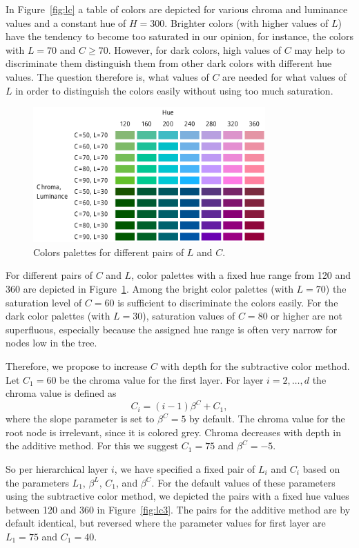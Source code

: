 \documentclass[review,journal]{vgtc}         %
\begin{document}
In Figure~\ref{fig:lc} a table of colors are depicted for various chroma and luminance values and a constant hue of $H=300$. Brighter colors (with higher values of $L$) have the tendency to become too saturated in our opinion, for instance, the colors with $L=70$ and $C\geq70$. However, for dark colors, high values of $C$ may help to discriminate them distinguish them from other dark colors with different hue values. The question therefore is, what values of $C$ are needed for what values of $L$ in order to distinguish the colors easily without using too much saturation.


\begin{figure}[!b]
  \centering
  \includegraphics[width=3.5in]{LC2.pdf}
  \caption{Colors palettes for different pairs of $L$ and $C$.}\label{fig:lc2}
\end{figure}

For different pairs of $C$ and $L$, color palettes with a fixed hue range from 120 and 360 are depicted in Figure~\ref{fig:lc2}. Among the bright color palettes (with $L=70$) the saturation level of $C=60$ is sufficient to discriminate the colors easily. For the dark color palettes (with $L=30$), saturation values of $C=80$ or higher are not superfluous, especially because the assigned hue range is often very narrow for nodes low in the tree.

Therefore, we propose to increase $C$ with depth for the subtractive color method. Let $C_1=60$ be the chroma value for the first layer. For layer $i=2,\ldots, d$ the chroma value is defined as
\begin{equation}
C_i=(i-1)\beta^C + C_1,
\end{equation}
where the slope parameter is set to $\beta^C=5$ by default. The chroma value for the root node is irrelevant, since it is colored grey. Chroma decreases with depth in the additive method. For this we suggest $C_1=75$ and $\beta^C=-5$.

So per hierarchical layer $i$, we have specified a fixed pair of $L_i$ and $C_i$ based on the parameters $L_1$, $\beta^L$, $C_1$, and $\beta^C$. For the default values of these parameters using the subtractive color method, we depicted the pairs with a fixed hue values between 120 and 360 in Figure~\ref{fig:lc3}. The pairs for the additive method are by default identical, but reversed where the parameter values for first layer are $L_1=75$ and $C_1=40$.
\end{document}
